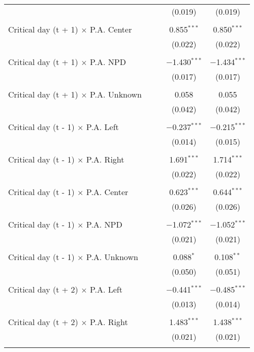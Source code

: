 \documentclass[
]{article}
\begin{document}
\begin{table}[!htbp]
{\begin{tabular}{@{\extracolsep{5pt}}lcccc}
  &  &  & (0.019) & (0.019) \\ 
  & & & & \\ 
 Critical day (t + 1) $\times$ P.A. Center &  &  & 0.855$^{***}$ & 0.850$^{***}$ \\ 
  &  &  & (0.022) & (0.022) \\ 
  & & & & \\ 
 Critical day (t + 1) $\times$ P.A. NPD &  &  & $-$1.430$^{***}$ & $-$1.434$^{***}$ \\ 
  &  &  & (0.017) & (0.017) \\ 
  & & & & \\ 
 Critical day (t + 1) $\times$ P.A. Unknown &  &  & 0.058 & 0.055 \\ 
  &  &  & (0.042) & (0.042) \\ 
  & & & & \\ 
 Critical day (t - 1) $\times$ P.A. Left &  &  & $-$0.237$^{***}$ & $-$0.215$^{***}$ \\ 
  &  &  & (0.014) & (0.015) \\ 
  & & & & \\ 
 Critical day (t - 1) $\times$ P.A. Right &  &  & 1.691$^{***}$ & 1.714$^{***}$ \\ 
  &  &  & (0.022) & (0.022) \\ 
  & & & & \\ 
 Critical day (t - 1) $\times$ P.A. Center &  &  & 0.623$^{***}$ & 0.644$^{***}$ \\ 
  &  &  & (0.026) & (0.026) \\ 
  & & & & \\ 
 Critical day (t - 1) $\times$ P.A. NPD &  &  & $-$1.072$^{***}$ & $-$1.052$^{***}$ \\ 
  &  &  & (0.021) & (0.021) \\ 
  & & & & \\ 
 Critical day (t - 1) $\times$ P.A. Unknown &  &  & 0.088$^{*}$ & 0.108$^{**}$ \\ 
  &  &  & (0.050) & (0.051) \\ 
  & & & & \\ 
 Critical day (t + 2) $\times$ P.A. Left &  &  & $-$0.441$^{***}$ & $-$0.485$^{***}$ \\ 
  &  &  & (0.013) & (0.014) \\ 
  & & & & \\ 
 Critical day (t + 2) $\times$ P.A. Right &  &  & 1.483$^{***}$ & 1.438$^{***}$ \\ 
  &  &  & (0.021) & (0.021) \\ 
  & & & & \\ 

\end{tabular}}
\end{table}
\end{document}
